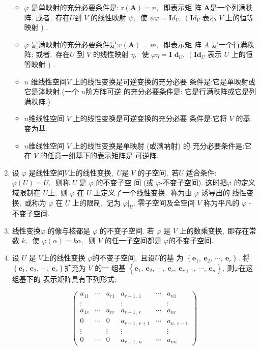 \begin{enumerate}
\begin{itemize}
			\item$  \varphi $ 是单映射的充分必要条件是:  $\mathrm{r}(\boldsymbol{A})=n ,\ $ 即表示矩 阵  $\boldsymbol{A}  $是一个列满秩阵. 或者,\  存在$  U  $到 $ V $ 的线性映射 $ \psi ,\ $ 使  $\psi \varphi=\boldsymbol{I} d_{V},\ \left(\boldsymbol{I} d_{V}\right. $ 表示 $ V $ 上的恒等映射  ) .
			\item $ \varphi $ 是满映射的充分必要条件是:$  r(\boldsymbol{A})=m ,\ $ 即表示矩 阵 $A $ 是一个行满秩阵; 或者,\  存在$  U $ 到 $ V $ 的线性映射  $\eta ,\ $ 使  $\varphi \eta=\boldsymbol{I}$ $\boldsymbol{d}_{U},\ \left(\boldsymbol{I} \boldsymbol{d}_{U}\right. $ 表示  $U $ 上的恒等映射  ) .
			\item $ n $ 维线性空间$  V $ 上的线性变换是可逆变换的充分必要 条件是:它是单映射或它是泍映射.(一个 $ n  $阶方阵可逆 的充分必要条件是: 它是行满秩阵或它是列满秩阵.)
			\item  $n  $维线性空间 $ V$  上的线性变换是可逆变换的充分必要 条件是:它将 $ V$  的基变为基.
			\item $n  $维线性空间 $ V $ 上的线性变换是单映射 (或满㘨射) 的 充分必要条件是:它在 $ V $ 的任意一组基下的表示矩阵是 可逆阵.
		\end{itemize}
		
		\item 设  $\varphi $ 是线性空间$  V  $上的线性变换,\  $ U  $是  $V$  的子空问,\  若$  U $ 适合条件: $ \varphi(U)=U ,\ $ 则称  $U$  是  $\varphi $ 的不变子空 间 (或 $ \varphi $-不变子空间). 这时把$  \varphi$  的定义域限制在 $ U  $上,\  则 $ \varphi$  在 $ U $ 上定义了一个线性变换,\  称为由 $ \varphi$  诱导出的 线性变换,\  或称为 $ \varphi $ 在 $ U$  上的限制,\  记为  $\left.\varphi\right|_{U} .$ 零子空间及全空间 $ V $ 称为平凡的  $\varphi$ -不变子空间.
		\item 线性变换$  \varphi$  的像与核都是  $\varphi $ 的不变子空间. 若  $\varphi $ 是 $ V $ 上的数乘变换,\  即存在常数  $k ,\ $ 使  $\varphi(\alpha)=k \alpha ,\ $ 则 $ V $ 的任一子空间都是  $\varphi  $的不变子空间.
		\item 设 $ U $ 是  $V  $上的线性变换  $\varphi  $的不变子空间,\  且设$ U  $的基 为 $ \left\{\boldsymbol{e}_{1},\  \boldsymbol{e}_{2},\  \cdots,\  \boldsymbol{e}_{r}\right\} .$ 将$  \left\{\boldsymbol{e}_{1},\  \boldsymbol{e}_{2},\  \cdots,\  \boldsymbol{e}_{r}\right\}  $扩充为  $V$  的一 组基 $ \left\{\boldsymbol{e}_{1},\  \boldsymbol{e}_{2},\  \cdots,\  \boldsymbol{e}_{r},\  \boldsymbol{e}_{r+1},\  \cdots,\  \boldsymbol{e}_{n}\right\} ,\  $则$  \varphi  $在这组基下的 表示矩阵具有下列形式:
		
		$$\left(\begin{array}{cccccc}
			a_{11} & \cdots & a_{r 1} & a_{r+1,\ 1} & \cdots & a_{n 1} \\
			\vdots & & \vdots & \vdots & & \vdots \\
			a_{1 r} & \cdots & a_{r r} & a_{r+1,\  r} & \cdots & a_{n r} \\
			0 & \cdots & 0 & a_{r+1,\  r+1} & \cdots & a_{n,\  r-1} \\
			\vdots & & \vdots & \vdots & & \vdots \\
			0 & \cdots & 0 & a_{r+1,\  n} & \cdots & a_{n n}
		\end{array}\right)$$
		

\end{enumerate}

